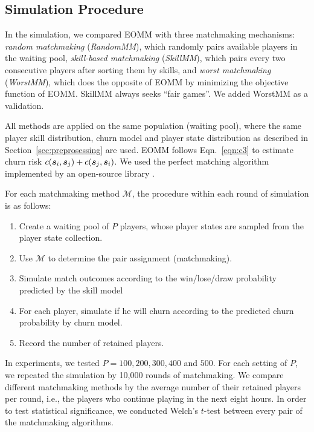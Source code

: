 
\subsection{Simulation Procedure}
In the simulation, we compared EOMM with three matchmaking mechanisms: \textit{random matchmaking} (\textit{RandomMM}), which randomly pairs available players in the waiting pool, \textit{skill-based matchmaking} (\textit{SkillMM}), which pairs every two consecutive players after sorting them by skills, and \textit{worst matchmaking} (\textit{WorstMM}), which does the opposite of EOMM by minimizing the objective function of EOMM. SkillMM always seeks ``fair games''. We added WorstMM as a validation.

All methods are applied on the same population (waiting pool), where the same player skill distribution, churn model and player state distribution as described in Section~\ref{sec:preprosessing} are used. EOMM follows Eqn.~\ref{eqn:c3} to estimate churn risk $c(\boldsymbol{s}_i, \boldsymbol{s}_j) + c(\boldsymbol{s}_j, \boldsymbol{s}_i)$. We used the perfect matching algorithm \citep{gabow1974implementation,lawler2001combinatorial} implemented by an open-source library \citep{onlineperfectmatching}.



For each matchmaking method $\mathcal{M}$, the procedure within each round of simulation is as follows:
\begin{enumerate}
\item Create a waiting pool of $P$ players, whose player states are sampled from the player state collection.
\item Use $\mathcal{M}$ to determine the pair assignment (matchmaking).
\item Simulate match outcomes according to the win/lose/draw probability predicted by the skill model
\item For each player, simulate if he will churn according to the predicted churn probability by churn model.
\item Record the number of retained players.
\end{enumerate}

In experiments, we tested $P=100, 200, 300, 400$ and $500$. For each setting of $P$, we repeated the simulation by 10,000 rounds of matchmaking. We compare different matchmaking methods by the average number of their retained players per round, i.e., the players who continue playing in the next eight hours. In order to test statistical significance, we conducted Welch's $t$-test between every pair of the matchmaking algorithms.

